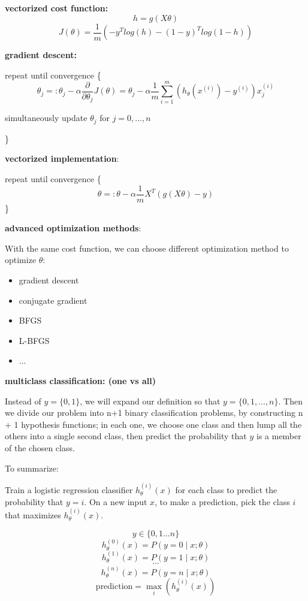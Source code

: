 \documentclass{article}
\begin{document}
\noindent \textbf{vectorized cost function:}
\[h = g(X\theta)\]
\[J(\theta) = \frac{1}{m} (- y^T log(h) - (1 - y)^T log(1 - h))\]

\noindent \textbf{gradient descent:}

\noindent repeat until convergence \{
\[\theta_j =: \theta_j - \alpha \frac{\partial}{\partial \theta_j} J(\theta) = \theta_j - \alpha \frac{1}{m} \sum_{i = 1}^m (h_{\theta}(x^{(i)}) - y^{(i)}) x^{(i)}_j\]
\centerline{simultaneously update \(\theta_j\) for \(j = 0, \dots, n\)}
\}

\bigskip

\noindent \textbf{vectorized implementation}:

\noindent repeat until convergence \{
\[\theta =: \theta - \alpha \frac{1}{m} X^T (g(X\theta) - y)\]
\}

\bigskip

\noindent \textbf{advanced optimization methods}:

\noindent With the same cost function, we can choose different optimization method to optimize \(\theta\):

\begin{itemize}
\item gradient descent
\item conjugate gradient
\item BFGS
\item L-BFGS
\item ...
\end{itemize}

\bigskip

\noindent \textbf{multiclass classification: (one vs all)}

\noindent Instead of \(y = \{0, 1\}\), we will expand our definition so that \(y = \{0, 1, ..., n\}\). Then we divide our problem into n+1 binary classification problems, by constructing n + 1 hypothesis functions; in each one, we choose one class and then lump all the others into a single second class, then predict the probability that \(y\) is a member of the chosen class.

\bigskip

\noindent To summarize: 

\noindent Train a logistic regression classifier \(h_{\theta}^{(i)}(x)\) for each class to predict the probability that \(y = i\). On a new input \(x\), to make a prediction, pick the class \(i\) that maximizes \(h_{\theta} ^{(i)}(x)\).

\[y \in \{0, 1 ... n\}\] 
\[h_{\theta}^{(0)}(x) = P(y = 0 \mid x ; \theta)\]
\[h_{\theta}^{(1)}(x) = P(y = 1 \mid x ; \theta)\]
\[\cdots\]
\[h_{\theta}^{(n)}(x) = P(y = n \mid x ; \theta)\] 
\[\text{prediction} = \max_i(h_{\theta}^{(i)}(x))\]
\end{document}
